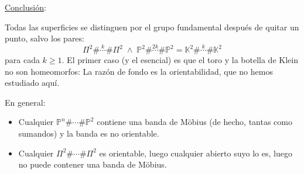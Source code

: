 \documentclass[10pt,a4paper,openright]{book}
\theoremstyle{break}
\begin{document}
\underline{Conclusión}:

Todas las superficies se distinguen por el grupo fundamental después de quitar un punto, salvo los pares:
\[
\Pi^2 \# \stackrel{k}{\cdots} \# \Pi^2\; \land \;\mathbb{P}^{2} \# \stackrel{2k}{\cdots} \# \mathbb{P}^{2} = \mathbb{K}^2 \# \stackrel{k}{\cdots} \# \mathbb{K}^2
\]
para cada $k \ge 1$. El primer caso (y el esencial) es que el toro y la botella de Klein no son homeomorfos: La razón de fondo es la orientabilidad, que no hemos estudiado aquí.

En general:
\begin{itemize}
    \item Cualquier $\mathbb{P}^{n} \# \cdots \# \mathbb{P}^{2}$ contiene una banda de Möbius (de hecho, tantas como sumandos) y la banda es no orientable.
    \item Cualquier $\Pi^2 \# \cdots \# \Pi^2$ es orientable, luego cualquier abierto suyo lo es, luego no puede contener una banda de Möbius.
\end{itemize}
\end{document}

